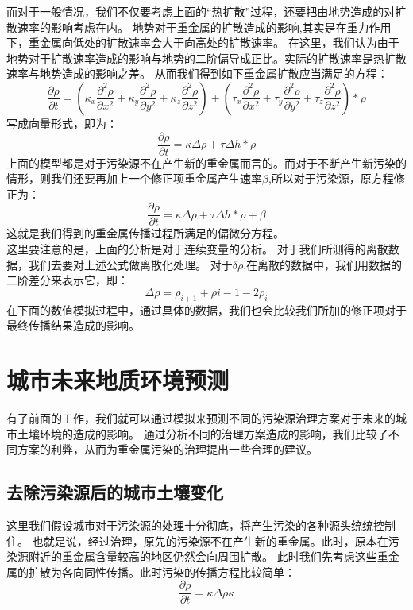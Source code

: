 \documentclass[a4paper]{article}
\begin{document}
\indent 而对于一般情况，我们不仅要考虑上面的“热扩散”过程，还要把由地势造成的对扩散速率的影响考虑在内。
地势对于重金属的扩散造成的影响,其实是在重力作用下，重金属向低处的扩散速率会大于向高处的扩散速率。
在这里，我们认为由于地势对于扩散速率造成的影响与地势的二阶偏导成正比。实际的扩散速率是热扩散速率与地势造成的影响之差。
从而我们得到如下重金属扩散应当满足的方程：
\begin{equation}
\frac{\partial \rho}{\partial t} 
= (\kappa_x\frac{\partial^2 \rho}{\partial x^2}+\kappa_y\frac{\partial^2 \rho}{\partial y^2}+\kappa_z\frac{\partial^2 \rho}{\partial z^2})
+( \tau_x\frac{\partial^2 \rho}{\partial x^2}+\tau_y\frac{\partial^2 \rho}{\partial y^2}+\tau_z\frac{\partial^2 \rho}{\partial z^2})*\rho
\end{equation}
写成向量形式，即为：
\begin{equation}
\frac{\partial \rho}{\partial t} = \kappa \Delta \rho + \tau \Delta h *\rho
\end{equation}
上面的模型都是对于污染源不在产生新的重金属而言的。而对于不断产生新污染的情形，则我们还要再加上一个修正项重金属产生速率$\beta$,所以对于污染源，原方程修正为：
\begin{equation}
\frac{\partial \rho}{\partial t} = \kappa \Delta \rho + \tau \Delta h *\rho + \beta
\end{equation}
这就是我们得到的重金属传播过程所满足的偏微分方程。  \\
\indent 这里要注意的是，上面的分析是对于连续变量的分析。
对于我们所测得的离散数据，我们去要对上述公式做离散化处理。
对于$\delta \rho $,在离散的数据中，我们用数据的二阶差分来表示它，即：
\begin{equation}
\Delta \rho= \rho_{i+1}+\rho{i-1}-2\rho_i
\end{equation}
在下面的数值模拟过程中，通过具体的数据，我们也会比较我们所加的修正项对于最终传播结果造成的影响。


\section{城市未来地质环境预测}
有了前面的工作，我们就可以通过模拟来预测不同的污染源治理方案对于未来的城市土壤环境的造成的影响。
通过分析不同的治理方案造成的影响，我们比较了不同方案的利弊，从而为重金属污染的治理提出一些合理的建议。

\subsection{去除污染源后的城市土壤变化}
这里我们假设城市对于污染源的处理十分彻底，将产生污染的各种源头统统控制住。
也就是说，经过治理，原先的污染源不在产生新的重金属。此时，原本在污染源附近的重金属含量较高的地区仍然会向周围扩散。
此时我们先考虑这些重金属的扩散为各向同性传播。此时污染的传播方程比较简单：
\begin{equation}
\frac{\partial \rho}{\partial t} = \kappa  \Delta \rho\kappa  
\end{equation}
\end{document}
